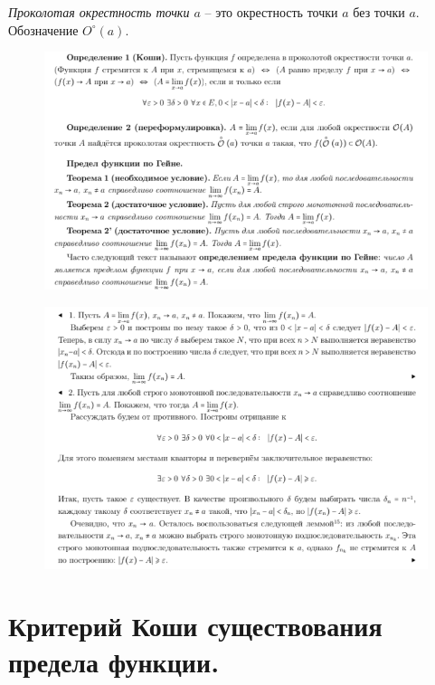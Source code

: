 \textit{Проколотая окрестность точки $a$} -- это окрестность точки $a$ без точки $a$. Обозначение $O^{\circ}(a)$. 
 \begin{figure}[h!]
\centering
\includegraphics[scale=0.6]{Pictures/22_1.png}
\end{figure}
 \begin{figure}[h!]
\centering
\includegraphics[scale=0.6]{Pictures/22_2.png}
\end{figure}
\newpage




\section{Критерий Коши существования предела функции.}

